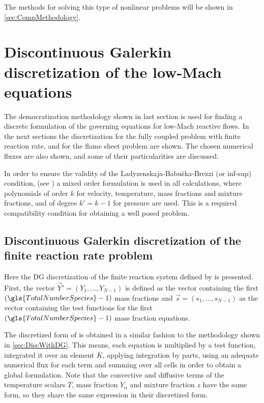 The methods for solving this type of nonlinear problems will be shown in \cref{sec:CompMethodology}.
\section{Discontinuous Galerkin discretization of the low-Mach equations}
The democratization methodology shown in last section is used for finding a discrete formulation of the governing equations for low-Mach reactive flows. In the next sections the discretization for the fully coupled problem with finite reaction rate, and for the flame sheet problem are shown. The chosen numerical fluxes are also shown, and some of their particularities are discussed. 

In order to ensure the validity  of the  Ladyzenskaja-Babu\u{s}ka-Brezzi (or inf-sup) condition, (see \textcite{babuskaFiniteElementMethod1973})  a mixed order formulation is used in all calculations, where polynomials of order $k$ for velocity, temperature, mass fractions and mixture fractions, and of degree $k' = k-1$ for pressure are used. This is a required compatibility condition for obtaining a well posed problem. 
\subsection{Discontinuous Galerkin discretization of the finite reaction rate problem}
Here the DG discretization of the finite reaction system defined by  is presented. 
First, the vector $\vec{Y}' = \left(Y_1,\dots,Y_{N-1}\right)$ is defined as the vector containing the first $(\gls{TotalNumberSpecies}-1)$ mass fractions and $\vec{s} = \left(s_1, \dots, s_{N-1} \right)$ as the vector containing the test functions for the first $(\gls{TotalNumberSpecies}-1)$  mass fraction equations. 

The discretized form of  is obtained in a similar fashion to the methodology shown in \cref{sec:DiscWithDG}. This means, each equation is multiplied by a test function, integrated it over an element $K$, applying integration by parts, using an adequate numerical flux for each term and summing over all cells in order to obtain a global formulation. Note that the convective and diffusive terms of the temperature scalars $T$, mass fraction $Y_\alpha$ and mixture fraction $z$ have the same form, so they share the same expression in their discretized form.

